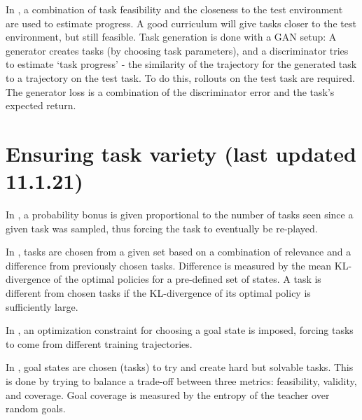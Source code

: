 \documentclass[letterpaper]{article}
\theoremstyle{definition}
\begin{document}
In \cite{Fang2020}, a combination of task feasibility and the closeness to the test environment are used to estimate progress. A good curriculum will give tasks closer to the test environment, but still feasible. Task generation is done with a GAN setup: A generator creates tasks (by choosing task parameters), and a discriminator tries to estimate `task progress' - the similarity of the trajectory for the generated task to a trajectory on the test task. To do this, rollouts on the test task are required. The generator loss is a combination of the discriminator error and the task's expected return.

\section{Ensuring task variety (last updated 11.1.21)} \label{sec:variety}

In \cite{Jiang2020}, a probability bonus is given proportional to the number of tasks seen since a given task was sampled, thus forcing the task to eventually be re-played.

In \cite{Gutierrez2020}, tasks are chosen from a given set based on a combination of relevance and a difference from previously chosen tasks. Difference is measured by the mean KL-divergence of the optimal policies for a pre-defined set of states. A task is different from chosen tasks if the KL-divergence of its optimal policy is sufficiently large.

In \cite{Reny2019}, an optimization constraint for choosing a goal state is imposed, forcing tasks to come from different training trajectories.

In \cite{Racaniere2019}, goal states are chosen (tasks) to try and create hard but solvable tasks. 
This is done by trying to balance a trade-off between three metrics: feasibility, validity, and coverage.
Goal coverage is measured by the entropy of the teacher over random goals.
\end{document}
